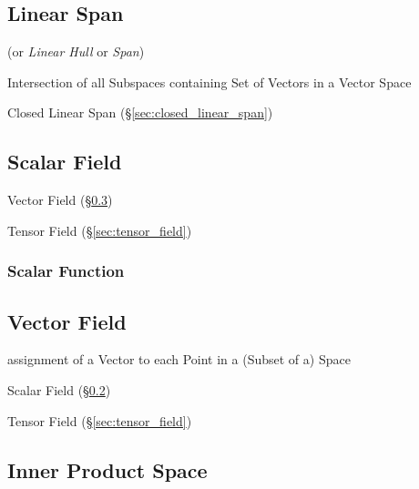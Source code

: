 \subsection{Linear Span}\label{sec:linear_span}

(or \emph{Linear Hull} or \emph{Span})

Intersection of all Subspaces containing Set of Vectors in a Vector
Space

Closed Linear Span (\S\ref{sec:closed_linear_span})



\subsection{Scalar Field}\label{sec:scalar_field}

Vector Field (\S\ref{sec:vector_field})

Tensor Field (\S\ref{sec:tensor_field})



\subsubsection{Scalar Function}\label{sec:scalar_function}



\subsection{Vector Field}\label{sec:vector_field}

assignment of a Vector to each Point in a (Subset of a) Space

Scalar Field (\S\ref{sec:scalar_field})

Tensor Field (\S\ref{sec:tensor_field})



\subsection{Inner Product Space}\label{sec:innerproduct_space}

